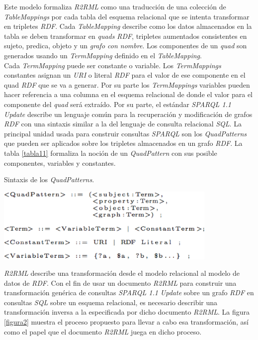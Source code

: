 Este modelo formaliza \textit{R2RML} como una traducci\'on de una colecci\'on de \textit{TableMappings} por cada tabla del esquema relacional que se intenta transformar en tripletes \textit{RDF}. Cada \textit{TableMapping} describe como los datos almacenados en la tabla se deben transformar en \textit{quads} \textit{RDF}, tripletes aumentados consistentes en sujeto, predica, objeto y un \textit{grafo con nombre}. Los componentes de un \textit{quad} son generados usando un \textit{TermMapping} definido en el \textit{TableMapping}.\\
Cada \textit{TermMapping} puede ser constante o variable. Los \textit{TermMappings} constantes asignan un \textit{URI} o literal \textit{RDF} para el valor de ese componente en el quad \textit{RDF} que se va a generar. Por su parte los \textit{TermMappings} variables pueden hacer referencia a una columna en el esquema relacional de donde el valor para el componente del \textit{quad} ser\'a extra\'ido.
Por su parte, el est\'andar \textit{SPARQL 1.1 Update} describe un lenguaje com\'un para la recuperaci\'on y modificaci\'on de grafos \textit{RDF} con una sintaxis similar a la del lenguaje de consulta relacional \textit{SQL}. La principal unidad usada para construir consultas \textit{SPARQL} son los \textit{QuadPatterns} que pueden ser aplicados sobre los tripletes almacenados en un grafo \textit{RDF}. La tabla \ref{tabla11} formaliza la noci\'on de un \textit{QuadPattern} con sus posible componentes, variables y constantes.\\

\begin{table}
\vspace{2.4in}
\caption{Sintaxis de los \textit{QuadPatterns}.}
\includegraphics[width=0.8\textwidth]{tabla11}
\label{tabla11}
\end{table}


\textit{R2RML} describe una transformaci\'on desde el modelo relacional al modelo de datos de \textit{RDF}. Con el fin de usar un documento \textit{R2RML} para construir una transformaci\'on gen\'erica de consultas \textit{SPARQL 1.1 Update} sobre un grafo \textit{RDF} en consultas \textit{SQL} sobre un esquema relacional, es necesario describir una transformaci\'on inversa a la especificada por dicho documento \textit{R2RML}. La figura \ref{figura2} muestra el proceso propuesto para llevar a cabo esa transformaci\'on, as\'i como el papel que el documento \textit{R2RML} juega en dicho proceso.\\

